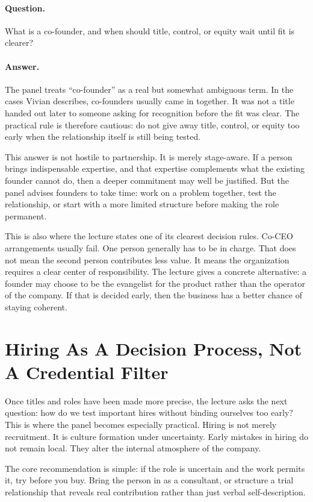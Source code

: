 \paragraph{Question.} What is a co-founder, and when should title, control, or equity wait until fit is clearer?

\paragraph{Answer.} The panel treats ``co-founder'' as a real but somewhat ambiguous term. In the cases Vivian describes, co-founders usually came in together. It was not a title handed out later to someone asking for recognition before the fit was clear. The practical rule is therefore cautious: do not give away title, control, or equity too early when the relationship itself is still being tested.

This answer is not hostile to partnership. It is merely stage-aware. If a person brings indispensable expertise, and that expertise complements what the existing founder cannot do, then a deeper commitment may well be justified. But the panel advises founders to take time: work on a problem together, test the relationship, or start with a more limited structure before making the role permanent.

This is also where the lecture states one of its clearest decision rules. Co-CEO arrangements usually fail. One person generally has to be in charge. That does not mean the second person contributes less value. It means the organization requires a clear center of responsibility. The lecture gives a concrete alternative: a founder may choose to be the evangelist for the product rather than the operator of the company. If that is decided early, then the business has a better chance of staying coherent.

\section{Hiring As A Decision Process, Not A Credential Filter}

Once titles and roles have been made more precise, the lecture asks the next question: how do we test important hires without binding ourselves too early? This is where the panel becomes especially practical. Hiring is not merely recruitment. It is culture formation under uncertainty. Early mistakes in hiring do not remain local. They alter the internal atmosphere of the company.

The core recommendation is simple: if the role is uncertain and the work permits it, try before you buy. Bring the person in as a consultant, or structure a trial relationship that reveals real contribution rather than just verbal self-description.

